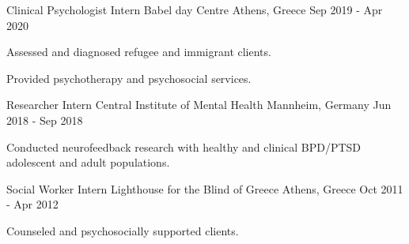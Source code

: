 

\begin{cventries}

\cventry
{Clinical Psychologist Intern} %
{Babel day Centre} %
{Athens, Greece} %
{Sep 2019 - Apr 2020} %
{
\begin{cvitems} %
\item {
Assessed and diagnosed refugee and immigrant clients.
}
\item {
Provided psychotherapy and psychosocial services.
}
\end{cvitems}
}

\cventry
{Researcher Intern} %
{Central Institute of Mental Health} %
{Mannheim, Germany} %
{Jun 2018 - Sep 2018} %
{
\begin{cvitems} %
\item {Conducted neurofeedback research with healthy and clinical BPD/PTSD adolescent and adult populations.}
\end{cvitems}
}
\cventry
{Social Worker Intern} %
{Lighthouse for the Blind of Greece} %
{Athens, Greece} %
{Oct 2011 - Apr 2012} %
{
\begin{cvitems} %
\item {Counseled and psychosocially supported clients.}
\end{cvitems}
}
\end{cventries}
